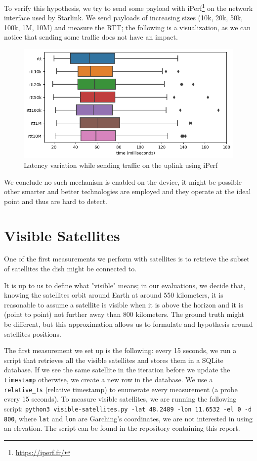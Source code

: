 \documentclass[IN,11pt,twoside,openright,idp,english]{tumthesis}
\begin{document}
To verify this hypothesis, we try to send some payload with iPerf\footnote{\url{https://iperf.fr/}} on the network interface used by Starlink. We send payloads of increasing sizes (10k, 20k, 50k, 100k, 1M, 10M) and measure the RTT; the following is a visualization, as we can notice that sending some traffic does not have an impact.

\begin{figure}
    \centering
    \includegraphics[width=0.6\columnwidth]{img/latency_iperf.png}
    \caption{Latency variation while sending traffic on the uplink using iPerf}
\end{figure}

We conclude no such mechanism is enabled on the device, it might be possible other smarter and better technologies are employed and they operate at the ideal point and thus are hard to detect.
\section{Visible Satellites}

One of the first measurements we perform with satellites is to retrieve the subset of satellites the dish might be connected to.

It is up to us to define what "visible" means; in our evaluations, we decide that, knowing the satellites orbit around Earth at around 550 kilometers, it is reasonable to assume a satellite is visible when it is above the horizon and it is (point to point) not further away than 800 kilometers. The ground truth might be different, but this approximation allows us to formulate and hypothesis around satellites positions. 

The first measurement we set up is the following: every 15 seconds, we run a script that retrieves all the visible satellites and stores them in a SQLite database. If we see the same satellite in the iteration before we update the \texttt{timestamp} otherwise, we create a new row in the database. We use a \texttt{relative\_ts} (relative timestamp) to enumerate every measurement (a probe every 15 seconds). To measure visible satellites, we are running the following script: \texttt{python3 visible-satellites.py -lat 48.2489 -lon 11.6532 -el 0 -d 800}, where \texttt{lat} and \texttt{lon} are Garching's coordinates, we are not interested in using an elevation. The script can be found in the repository containing this report.
\end{document}
